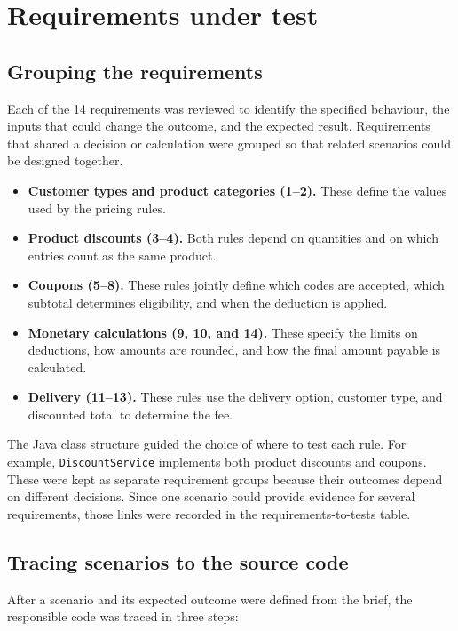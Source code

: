 \chapter{Requirements under test}
\label{chap:product}

\section{Grouping the requirements}
Each of the 14 requirements was reviewed to identify the specified
behaviour, the inputs that could change the outcome, and the expected
result. Requirements that shared a decision or calculation were grouped
so that related scenarios could be designed together.

\begin{itemize}
    \item \textbf{Customer types and product categories (1--2).}
    These define the values used by the pricing rules.
    \item \textbf{Product discounts (3--4).}
    Both rules depend on quantities and on which entries count as the
    same product.
    \item \textbf{Coupons (5--8).}
    These rules jointly define which codes are accepted, which subtotal
    determines eligibility, and when the deduction is applied.
    \item \textbf{Monetary calculations (9, 10, and 14).}
    These specify the limits on deductions, how amounts are rounded,
    and how the final amount payable is calculated.
    \item \textbf{Delivery (11--13).}
    These rules use the delivery option, customer type, and discounted
    total to determine the fee.
\end{itemize}

The Java class structure guided the choice of where to test each rule.
For example, \texttt{DiscountService} implements both product discounts
and coupons. These were kept as separate requirement groups because their
outcomes depend on different decisions. Since one scenario could provide
evidence for several requirements, those links were recorded in the
requirements-to-tests table.

\section{Tracing scenarios to the source code}
After a scenario and its expected outcome were defined from the brief,
the responsible code was traced in three steps:

